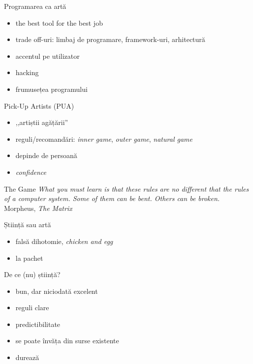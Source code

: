 \documentclass{beamer}
\begin{document}
\begin{frame}{Programarea ca artă}
  \begin{itemize}
    \pause
    \item the best tool for the best job
    \item trade off-uri: limbaj de programare, framework-uri, arhitectură
    \item accentul pe utilizator
    \item hacking
    \item frumusețea programului
  \end{itemize}
\end{frame}

\begin{frame}{Pick-Up Artists (PUA)}
  \begin{itemize}
    \pause
    \item ,,artiștii agățării''
    \item reguli/recomandări: \textit{inner game}, \textit{outer game}, \textit{natural game}
    \item depinde de persoană
    \item \textit{confidence}
  \end{itemize}
\end{frame}

\begin{frame}{The Game}
  \textit{What you must learn is that these rules are no different that the rules of a computer system. Some of them can be bent. Others can be broken.}\\
  \vspace{0.5cm}
  \hfill{Morpheus, \textit{The Matrix}}
\end{frame}

\begin{frame}{Știință sau artă}
  \begin{itemize}
    \pause
    \item falsă dihotomie, \textit{chicken and egg}
    \item la pachet
  \end{itemize}
\end{frame}

\begin{frame}{De ce (nu) știință?}
  \begin{itemize}
    \pause
    \item bun, dar niciodată excelent
    \item reguli clare
    \item predictibilitate
    \item se poate învăța din surse existente
    \item durează
  \end{itemize}
\end{frame}
\end{document}
